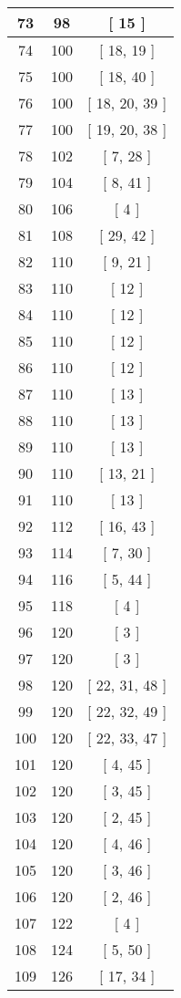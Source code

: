 \begin{center}
\begin{longtable}[H]{|| c c c ||}
\hline
73 & 98 & [ 15 ] \\ 
\hline
74 & 100 & [ 18, 19 ] \\ 
\hline
75 & 100 & [ 18, 40 ] \\ 
\hline
76 & 100 & [ 18, 20, 39 ] \\ 
\hline
77 & 100 & [ 19, 20, 38 ] \\ 
\hline
78 & 102 & [ 7, 28 ] \\ 
\hline
79 & 104 & [ 8, 41 ] \\ 
\hline
80 & 106 & [ 4 ] \\ 
\hline
81 & 108 & [ 29, 42 ] \\ 
\hline
82 & 110 & [ 9, 21 ] \\ 
\hline
83 & 110 & [ 12 ] \\ 
\hline
84 & 110 & [ 12 ] \\ 
\hline
85 & 110 & [ 12 ] \\ 
\hline
86 & 110 & [ 12 ] \\ 
\hline
87 & 110 & [ 13 ] \\ 
\hline
88 & 110 & [ 13 ] \\ 
\hline
89 & 110 & [ 13 ] \\ 
\hline
90 & 110 & [ 13, 21 ] \\ 
\hline
91 & 110 & [ 13 ] \\ 
\hline
92 & 112 & [ 16, 43 ] \\ 
\hline
93 & 114 & [ 7, 30 ] \\ 
\hline
94 & 116 & [ 5, 44 ] \\ 
\hline
95 & 118 & [ 4 ] \\ 
\hline
96 & 120 & [ 3 ] \\ 
\hline
97 & 120 & [ 3 ] \\ 
\hline
98 & 120 & [ 22, 31, 48 ] \\ 
\hline
99 & 120 & [ 22, 32, 49 ] \\ 
\hline
100 & 120 & [ 22, 33, 47 ] \\ 
\hline
101 & 120 & [ 4, 45 ] \\ 
\hline
102 & 120 & [ 3, 45 ] \\ 
\hline
103 & 120 & [ 2, 45 ] \\ 
\hline
104 & 120 & [ 4, 46 ] \\ 
\hline
105 & 120 & [ 3, 46 ] \\ 
\hline
106 & 120 & [ 2, 46 ] \\ 
\hline
107 & 122 & [ 4 ] \\ 
\hline
108 & 124 & [ 5, 50 ] \\ 
\hline
109 & 126 & [ 17, 34 ] \\ 

\end{longtable}
\end{center}
